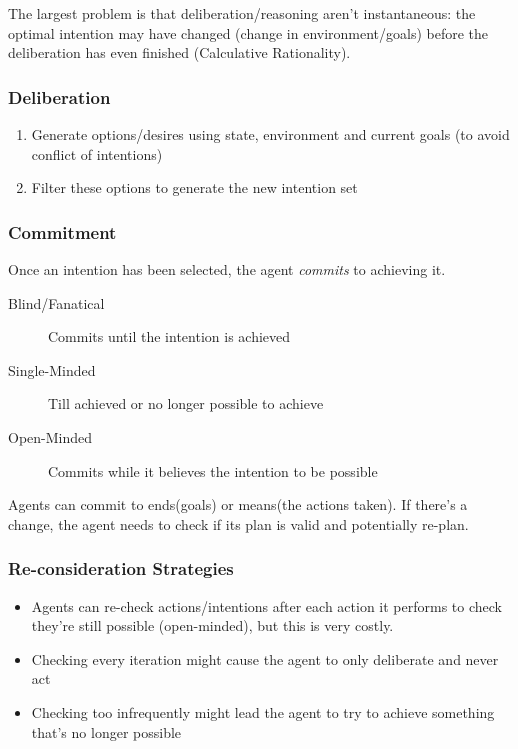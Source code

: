 The largest problem is that deliberation/reasoning aren't instantaneous: the optimal intention may have changed (change in environment/goals) before the deliberation has even finished (Calculative Rationality). 

\subsubsection{Deliberation}
\begin{enumerate}
    \item Generate options/desires using state, environment and current goals (to avoid\\ conflict of intentions)
    \item Filter these options to generate the new intention set
\end{enumerate}

\subsubsection{Commitment}
Once an intention has been selected, the agent \emph{commits} to achieving it.
\begin{description}
    \item [Blind/Fanatical] Commits until the intention is achieved
    \item [Single-Minded] Till achieved or no longer possible to achieve
    \item[Open-Minded] Commits while it believes the intention to be possible
\end{description}

Agents can commit to ends(goals) or means(the actions taken). If there's a change, the agent needs to check if its plan is valid and potentially re-plan.

\subsubsection{Re-consideration Strategies}
\begin{itemize}
    \item Agents can re-check actions/intentions after each action it performs to check they're still possible (open-minded), but this is very costly.
    \item Checking every iteration might cause the agent to only deliberate and never act 
    \item Checking too infrequently might lead the agent to try to achieve something that's no longer possible
\end{itemize} 

